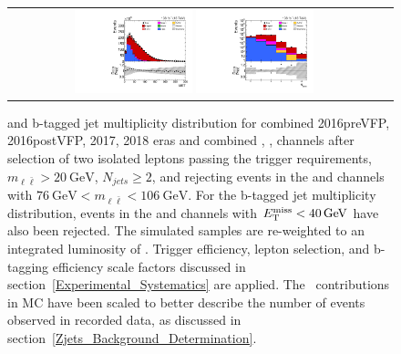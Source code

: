 \begin{figure}[htb]
    \begin{center}
        \begin{tabular}{cc}
            \includegraphics[width=0.325\textwidth]{fig_fullRun2UL/controlplots/combined/MET_preMETcut.pdf}
            \includegraphics[width=0.325\textwidth]{fig_fullRun2UL/controlplots/combined/HypBjetMulti_noBTag.pdf}
        \end{tabular}
        \caption{\footnotesize \ETmiss and b-tagged jet multiplicity distribution for combined 2016preVFP, 2016postVFP, 2017, 2018 eras and combined \ee, \emu, \mumu channels after selection of two isolated leptons passing the trigger requirements, $m_{\ell\bar{\ell}} > \SI{20}{\GeV}$, $N_{jets} \geq 2$, and rejecting events in the \ee and \mumu channels with $\SI{76}{\GeV} < m_{\ell\bar{\ell}} < \SI{106}{\GeV}$.
        For the b-tagged jet multiplicity distribution, events in the \ee and \mumu channels with $\ETmiss < \SI{40}{\GeV}$ have also been rejected.
        The simulated samples are re-weighted to an integrated luminosity of \lumivalueRuniiUL.
        Trigger efficiency, lepton selection, and b-tagging efficiency scale factors discussed in section~\ref{Experimental_Systematics} are applied.
        The \zjets\ contributions in MC have been scaled to better describe the number of events observed in recorded data, as discussed in section~\ref{Zjets_Background_Determination}.
        }
    \end{center}
\end{figure}

